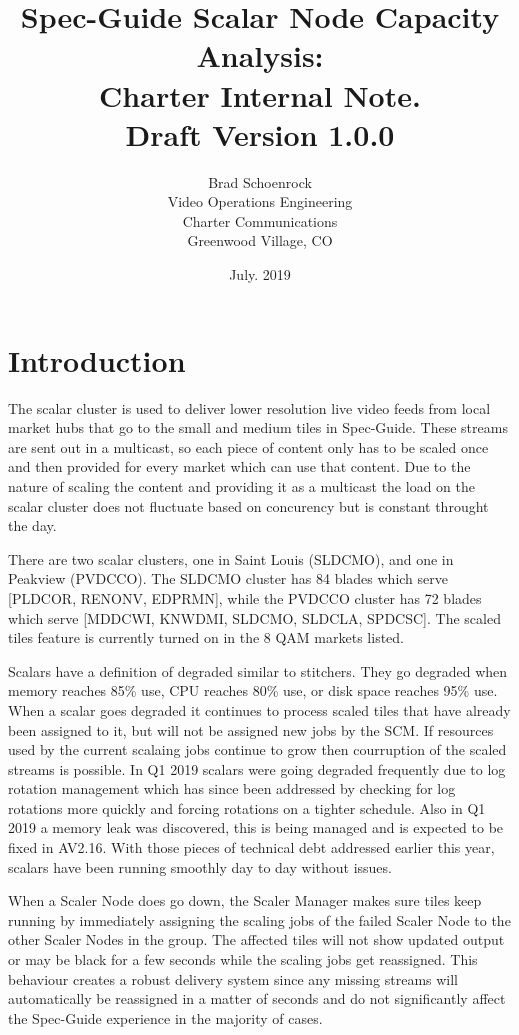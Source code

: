 \documentclass{article}
\author{Brad Schoenrock\\Video Operations Engineering\\Charter Communications\\Greenwood Village, CO}
\title{Spec-Guide Scalar Node Capacity Analysis:\\Charter Internal Note.\\Draft Version 1.0.0}
\date{July. 2019}
\begin{document}
\maketitle
\newpage

\tableofcontents
\newpage

\section{Introduction}
\label{SECTION-Introduction}

The scalar cluster is used to deliver lower resolution live video feeds from local market hubs that go to the small and medium tiles in Spec-Guide. These streams are sent out in a multicast, so each piece of content only has to be scaled once and then provided for every market which can use that content. Due to the nature of scaling the content and providing it as a multicast the load on the scalar cluster does not fluctuate based on concurency but is constant throught the day. 

There are two scalar clusters, one in Saint Louis (SLDCMO), and one in Peakview (PVDCCO). The SLDCMO cluster has 84 blades which serve [PLDCOR, RENONV, EDPRMN], while the PVDCCO cluster has 72 blades which serve [MDDCWI, KNWDMI, SLDCMO, SLDCLA, SPDCSC]. The scaled tiles feature is currently turned on in the 8 QAM markets listed. 

Scalars have a definition of degraded similar to stitchers. They go degraded when memory reaches 85\% use, CPU reaches 80\% use, or disk space reaches 95\% use. When a scalar goes degraded it continues to process scaled tiles that have already been assigned to it, but will not be assigned new jobs by the SCM. If resources used by the current scalaing jobs continue to grow then courruption of the scaled streams is possible. In Q1 2019 scalars were going degraded frequently due to log rotation management which has since been addressed by checking for log rotations more quickly and forcing rotations on a tighter schedule. Also in Q1 2019 a memory leak was discovered, this is being managed and is expected to be fixed in AV2.16. With those pieces of technical debt addressed earlier this year, scalars have been running smoothly day to day without issues. 

When a Scaler Node does go down, the Scaler Manager makes sure tiles keep running by immediately assigning the scaling jobs of the failed Scaler Node to the other Scaler Nodes in the group. The affected tiles will not show updated output or may be black for a few seconds while the scaling jobs get reassigned. This behaviour creates a robust delivery system since any missing streams will automatically be reassigned in a matter of seconds and do not significantly affect the Spec-Guide experience in the majority of cases. 
\end{document}
